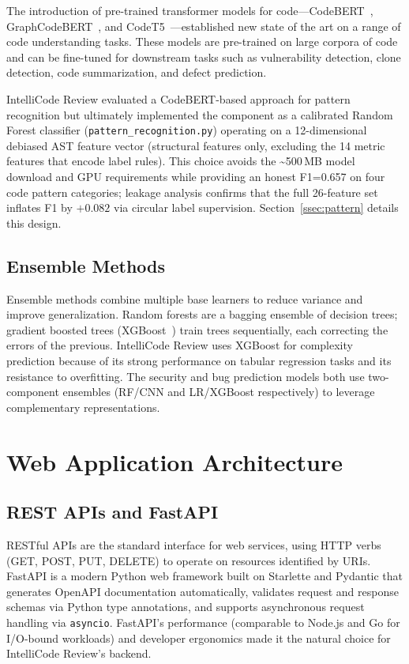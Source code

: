 \documentclass[12pt, oneside]{report}
\begin{document}
The introduction of pre-trained transformer models for code---CodeBERT~\cite{feng2020},
GraphCodeBERT~\cite{guo2021}, and CodeT5~\cite{wang2021}---established new state of the
art on a range of code understanding tasks. These models are pre-trained on large corpora
of code and can be fine-tuned for downstream tasks such as vulnerability detection,
clone detection, code summarization, and defect prediction.

IntelliCode Review evaluated a CodeBERT-based approach for pattern recognition but
ultimately implemented the component as a calibrated Random Forest classifier
(\texttt{pattern\_recognition.py}) operating on a 12-dimensional debiased AST feature
vector (structural features only, excluding the 14 metric features that encode label
rules). This choice avoids the \textasciitilde500\,MB model download and GPU requirements
while providing an honest F1=0.657 on four code pattern categories; leakage analysis
confirms that the full 26-feature set inflates F1 by $+0.082$ via circular label
supervision. Section~\ref{ssec:pattern} details this design.

\subsection{Ensemble Methods}

Ensemble methods combine multiple base learners to reduce variance and improve
generalization. Random forests are a bagging ensemble of decision trees; gradient
boosted trees (XGBoost~\cite{chen2016}) train trees sequentially, each correcting
the errors of the previous. IntelliCode Review uses XGBoost for complexity prediction
because of its strong performance on tabular regression tasks and its resistance to
overfitting. The security and bug prediction models both use two-component ensembles
(RF/CNN and LR/XGBoost respectively) to leverage complementary representations.

\section{Web Application Architecture}
\label{sec:bg-web}

\subsection{REST APIs and FastAPI}

\ac{REST}ful \acp{API} are the standard interface for web services, using HTTP verbs
(GET, POST, PUT, DELETE) to operate on resources identified by URIs. FastAPI is a modern
Python web framework built on Starlette and Pydantic that generates OpenAPI documentation
automatically, validates request and response schemas via Python type annotations, and
supports asynchronous request handling via \texttt{asyncio}. FastAPI's performance
(comparable to Node.js and Go for I/O-bound workloads) and developer ergonomics made it
the natural choice for IntelliCode Review's backend.
\end{document}
